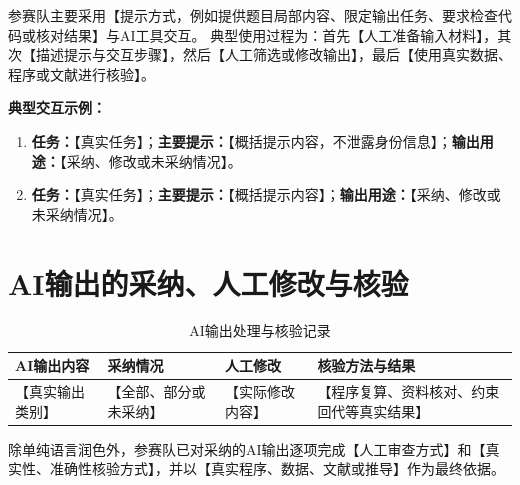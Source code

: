 \documentclass[fontset=mac, 12pt, a4paper]{ctexart}
\begin{document}
参赛队主要采用【提示方式，例如提供题目局部内容、限定输出任务、要求检查代码或核对结果】与AI工具交互。
典型使用过程为：首先【人工准备输入材料】，其次【描述提示与交互步骤】，然后【人工筛选或修改输出】，最后【使用真实数据、程序或文献进行核验】。

\noindent\textbf{典型交互示例：}

\begin{enumerate}
  \item \textbf{任务：}【真实任务】；\textbf{主要提示：}【概括提示内容，不泄露身份信息】；\textbf{输出用途：}【采纳、修改或未采纳情况】。
  \item \textbf{任务：}【真实任务】；\textbf{主要提示：}【概括提示内容】；\textbf{输出用途：}【采纳、修改或未采纳情况】。
\end{enumerate}

\section{AI输出的采纳、人工修改与核验}

\begin{table}[htbp]
  \centering
  \caption{AI输出处理与核验记录}
  \begin{tabular}{p{}p{}p{}p{}}
    \toprule
    \textbf{AI输出内容} & \textbf{采纳情况} & \textbf{人工修改} & \textbf{核验方法与结果} \\
    \midrule
    【真实输出类别】 & 【全部、部分或未采纳】 & 【实际修改内容】 & 【程序复算、资料核对、约束回代等真实结果】 \\
    \bottomrule
  \end{tabular}
  \label{tab:ai-verification}
\end{table}

除单纯语言润色外，参赛队已对采纳的AI输出逐项完成【人工审查方式】和【真实性、准确性核验方式】，并以【真实程序、数据、文献或推导】作为最终依据。
\end{document}
